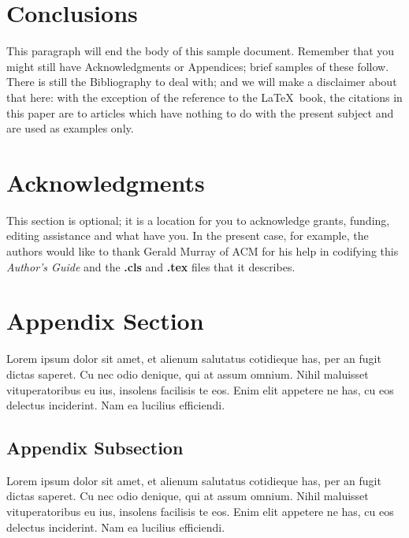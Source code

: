 \documentclass{acm_proc_article-sp}
\begin{document}
\section{Conclusions}
This paragraph will end the body of this sample document.
Remember that you might still have Acknowledgments or
Appendices; brief samples of these
follow.  There is still the Bibliography to deal with; and
we will make a disclaimer about that here: with the exception
of the reference to the \LaTeX\ book, the citations in
this paper are to articles which have nothing to
do with the present subject and are used as
examples only.

\section{Acknowledgments}
This section is optional; it is a location for you
to acknowledge grants, funding, editing assistance and
what have you.  In the present case, for example, the
authors would like to thank Gerald Murray of ACM for
his help in codifying this \textit{Author's Guide}
and the \textbf{.cls} and \textbf{.tex} files that it describes.

%

%
%
\appendix

\section{Appendix Section}

Lorem ipsum dolor sit amet, et alienum salutatus cotidieque has, per an fugit dictas saperet. Cu nec odio denique, qui at assum omnium. Nihil maluisset vituperatoribus eu ius, insolens facilisis te eos. Enim elit appetere ne has, cu eos delectus inciderint. Nam ea lucilius efficiendi.


\subsection{Appendix Subsection}

Lorem ipsum dolor sit amet, et alienum salutatus cotidieque has, per an fugit dictas saperet. Cu nec odio denique, qui at assum omnium. Nihil maluisset vituperatoribus eu ius, insolens facilisis te eos. Enim elit appetere ne has, cu eos delectus inciderint. Nam ea lucilius efficiendi.


\balancecolumns
\end{document}
